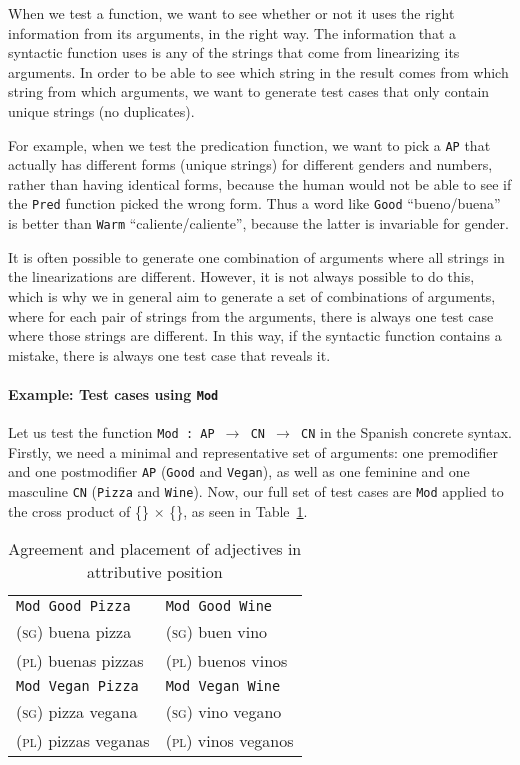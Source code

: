 \documentclass[runningheads]{llncs}
\def\t#1{\texttt{#1}}
\begin{document}
When we test a function, we want to see whether or not it uses the
right information from its arguments, in the right way. The
information that a syntactic function uses is any of the strings that
come from linearizing its arguments. In order to be able to see which
string in the result comes from which string from which arguments, we
want to generate test cases that only contain unique strings (no
duplicates). 

For example, when we test the predication function, we want to pick a
\t{AP} that actually has different forms (unique strings) for 
different genders and numbers, rather than having identical forms,
because the human would not be able to see if the \t{Pred} function
picked the wrong form. Thus a word like \t{Good} ``bueno/buena'' is
better than \t{Warm} ``caliente/caliente'', because the latter is
invariable for gender.

It is often possible to generate one combination of arguments where
all strings in the linearizations are different. However, it is not
always possible to do this, which is why we in general aim to generate
a set of combinations of arguments, where for each pair of strings
from the arguments, there is always one test case where those strings
are different. In this way, if the syntactic function contains a
mistake, there is always one test case that reveals it.

\paragraph{Example: Test cases using \t{Mod}} Let us test the function
\t{Mod : AP $\rightarrow$ CN $\rightarrow$ CN} in the Spanish
concrete syntax.
Firstly, we need a minimal and representative set of arguments:
one premodifier and one postmodifier \t{AP} (\t{Good} and
\t{Vegan}), as well as one feminine and one masculine
\t{CN} (\t{Pizza} and \t{Wine}). Now, our full set of test cases are
\t{Mod} applied to the cross product of \{\} $\times$ \{\}, as seen in Table~\ref{tab:adjAttr}.

\begin{table}
\caption{Agreement and placement of adjectives in attributive position}
\label{tab:adjAttr}
\centering
\begin{tabular}{| l | l |}
\hline
\t{Mod Good Pizza}   & \t{Mod Good Wine} \\ 
\textsc{(sg)} buena pizza             & \textsc{(sg)} buen vino \\
\textsc{(pl)} buenas pizzas           & \textsc{(pl)} buenos vinos \\ \hline

\t{Mod Vegan Pizza}   & \t{Mod Vegan Wine} \\ 
\textsc{(sg)} pizza  vegana            & \textsc{(sg)} vino  vegano \\
\textsc{(pl)} pizzas  veganas          & \textsc{(pl)} vinos  veganos \\ \hline
\end{tabular}
\end{table}
\end{document}
